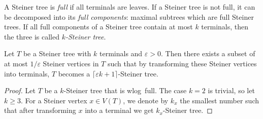 \documentclass[../skript.tex]{subfiles}
\begin{document}
A Steiner tree is \emph{full} if all terminals are leaves. If a Steiner tree is not full, it can be decomposed into its \emph{full components}: maximal subtrees which are full Steiner trees. If all full components of a Steiner tree contain at most $k$ terminals, then the three is called \emph{$k$-Steiner tree}.
\begin{lemma} %
\label{thm:67}
Let $T$ be a Steiner tree with $k$ terminals and $\varepsilon > 0$. Then there exists a subset of at most $1/\varepsilon$ Steiner vertices in $T$ such that by transforming these Steiner vertices into terminals, $T$ becomes a $\lceil \varepsilon k + 1 \rceil$-Steiner tree.
\end{lemma}
\begin{proof}
Let $T$ be a $k$-Steiner tree that is \ac{wlog}\ full. The case $k = 2$ is trivial, so let $k \geq 3$.
For a Steiner vertex $x \in V(T)$, we denote by $k_x$ the smallest number such that after transforming $x$ into a terminal we get  $k_x$-Steiner tree.


\end{proof}
\end{document}
